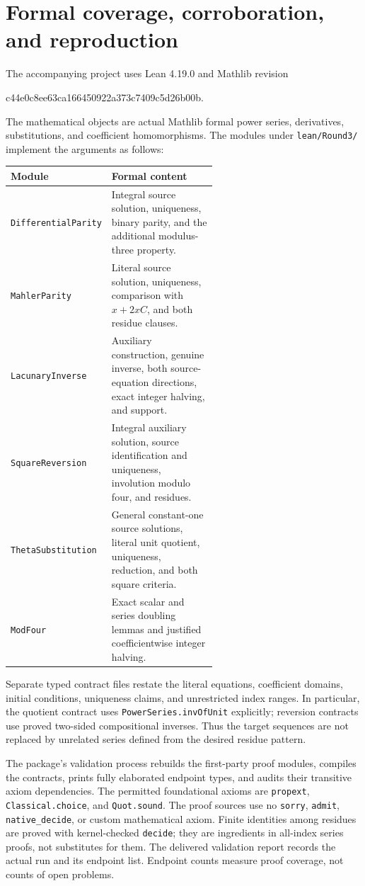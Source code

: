 \documentclass[11pt,a4paper]{article}
\theoremstyle{remark}
\begin{document}
\section{Formal coverage, corroboration, and reproduction}

The accompanying project uses Lean 4.19.0 and Mathlib revision
\begin{center}\small\ttfamily
c44e0c8ee63ca166450922a373c7409c5d26b00b.
\end{center}
The mathematical objects are actual Mathlib formal power series,
derivatives, substitutions, and coefficient homomorphisms. The modules
under \texttt{lean/Round3/} implement the arguments as follows:

\begin{center}\small
\begin{tabular}{@{}lp{0.58\linewidth}@{}}
\toprule
Module & Formal content\\
\midrule
\texttt{DifferentialParity} & Integral source solution, uniqueness,
  binary parity, and the additional modulus-three property.\\
\texttt{MahlerParity} & Literal source solution, uniqueness,
  comparison with $x+2xC$, and both residue clauses.\\
\texttt{LacunaryInverse} & Auxiliary construction, genuine inverse,
  both source-equation directions, exact integer halving, and support.\\
\texttt{SquareReversion} & Integral auxiliary solution, source
  identification and uniqueness, involution modulo four, and residues.\\
\texttt{ThetaSubstitution} & General constant-one source solutions,
  literal unit quotient, uniqueness, reduction, and both square criteria.\\
\texttt{ModFour} & Exact scalar and series doubling lemmas and
  justified coefficientwise integer halving.\\
\bottomrule
\end{tabular}
\end{center}

Separate typed contract files restate the literal equations, coefficient
domains, initial conditions, uniqueness claims, and unrestricted index
ranges. In particular, the quotient contract uses
\texttt{PowerSeries.invOfUnit} explicitly; reversion contracts use proved
two-sided compositional inverses. Thus the target sequences are not
replaced by unrelated series defined from the desired residue pattern.

The package's validation process rebuilds the first-party proof modules,
compiles the contracts, prints fully elaborated endpoint types, and audits
their transitive axiom dependencies. The permitted foundational axioms are
\texttt{propext}, \texttt{Classical.choice}, and \texttt{Quot.sound}.
The proof sources use no \texttt{sorry}, \texttt{admit},
\texttt{native\_decide}, or custom mathematical axiom. Finite identities
among residues are proved with kernel-checked \texttt{decide}; they are
ingredients in all-index series proofs, not substitutes for them.
The delivered validation report records the actual run and its endpoint
list. Endpoint counts measure proof coverage, not counts of open problems.
\end{document}

